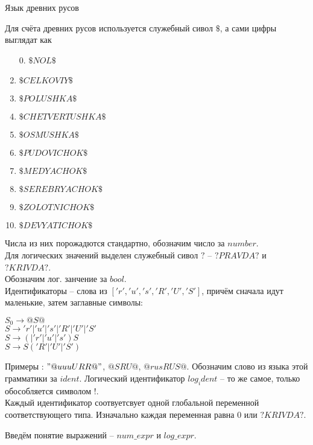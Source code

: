 \documentclass[12pt]{article}
\begin{document}
\begin{center} {\LARGE Язык древних русов} \end{center}

\bigskip


Для счёта древних русов используется служебный сивол $\$$, а сами цифры выглядат как
\begin{enumerate}
\item[0.] $\$NOL\$$
\item $\$CELKOVIY\$$
\item $\$POLUSHKA\$$
\item $\$CHETVERTUSHKA\$$
\item $\$OSMUSHKA\$$
\item $\$PUDOVICHOK\$$
\item $\$MEDYACHOK\$$
\item $\$SEREBRYACHOK\$$
\item $\$ZOLOTNICHOK\$$
\item $\$DEVYATICHOK\$$
\end{enumerate}

Числа из них порожадются стандартно, обозначим число за $number$.\\


Для логических значений выделен служебный сивол $?$ -- $?PRAVDA?$ и $?KRIVDA?$.\\
Обозначим лог. занчение за $bool$.\\



Идентификаторы -- слова из $['r', 'u', 's', 'R', 'U', 'S']$, причём сначала идут маленькие, затем заглавные символы:

\begin{myquote}
$S_0 \to @S@$\\
$S \to' r'|'u'|'s'|'R'|'U'|'S'$\\
$S \to (|'r'|'u'|'s')S$\\
$S \to S('R'|'U'|'S')$
\end{myquote}

Примеры : $"@uuuURR@"$, $@SRU@$, $@rusRUS@$.
Обозначим слово из языка этой грамматики за $ident$.
Логический идентификатор $log_ident$ -- то же самое, только обособляется символом $!$.\\
Каждый идентификатор соотвуетсвует одной глобальной переменной соответствующего типа. Изначально каждая переменная равна $0$ или $?KRIVDA?$.


Введём понятие выражений -- $num\_expr$ и $log\_expr$.\\
\end{document}
